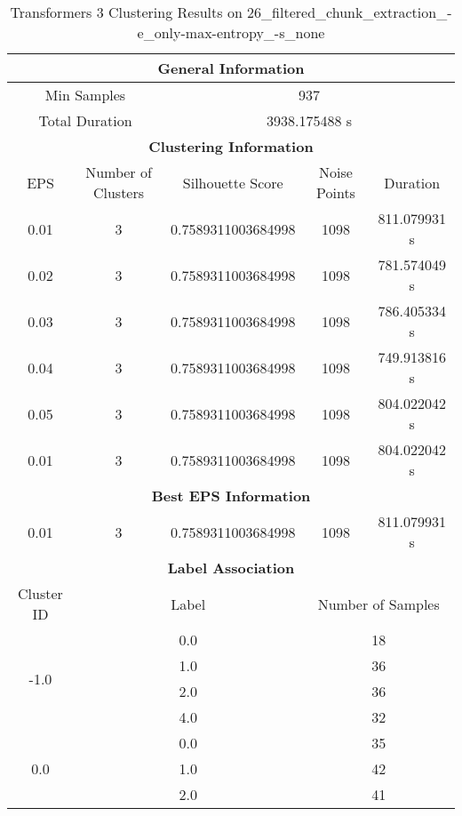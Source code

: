     
    \begin{longtable}{|c|c|c|c|c|}
    \caption{Transformers 3 Clustering Results on 26\_filtered\_chunk\_extraction\_-e\_only-max-entropy\_-s\_none} \label{tab:transformers_3_clustering_results}\\
    \hline
    \multicolumn{5}{|c|}{\textbf{General Information}} \\
    \hline
    \multicolumn{2}{|c|}{Min Samples} & \multicolumn{3}{c|}{937} \\
    \multicolumn{2}{|c|}{Total Duration} & \multicolumn{3}{c|}{3938.175488 s} \\
    \hline
    \multicolumn{5}{|c|}{\textbf{Clustering Information}} \\
    \hline
    EPS & Number of Clusters & Silhouette Score & Noise Points & Duration \\
    0.01 & 3 & 0.7589311003684998 & 1098 & 811.079931 s\\
    0.02 & 3 & 0.7589311003684998 & 1098 & 781.574049 s\\
    0.03 & 3 & 0.7589311003684998 & 1098 & 786.405334 s\\
    0.04 & 3 & 0.7589311003684998 & 1098 & 749.913816 s\\
    0.05 & 3 & 0.7589311003684998 & 1098 & 804.022042 s\\
    0.01 & 3 & 0.7589311003684998 & 1098 & 804.022042 s\\
    \hline
    \multicolumn{5}{|c|}{\textbf{Best EPS Information}} \\
    \hline
    0.01 & 3 & 0.7589311003684998 & 1098 & 811.079931 s\\
    \hline
    \multicolumn{5}{|c|}{\textbf{Label Association}} \\
    \hline
    Cluster ID & \multicolumn{2}{c|}{Label} & \multicolumn{2}{c|}{Number of Samples} \\
    \hline
    \multirow{4}{*}{-1.0} & \multicolumn{2}{c|}{0.0} & \multicolumn{2}{c|}{18} \\
    & \multicolumn{2}{c|}{1.0} & \multicolumn{2}{c|}{36} \\
    & \multicolumn{2}{c|}{2.0} & \multicolumn{2}{c|}{36} \\
    & \multicolumn{2}{c|}{4.0} & \multicolumn{2}{c|}{32} \\
    \hline
    \multirow{4}{*}{0.0} & \multicolumn{2}{c|}{0.0} & \multicolumn{2}{c|}{35} \\
    & \multicolumn{2}{c|}{1.0} & \multicolumn{2}{c|}{42} \\
    & \multicolumn{2}{c|}{2.0} & \multicolumn{2}{c|}{41} \\

\end{longtable}
